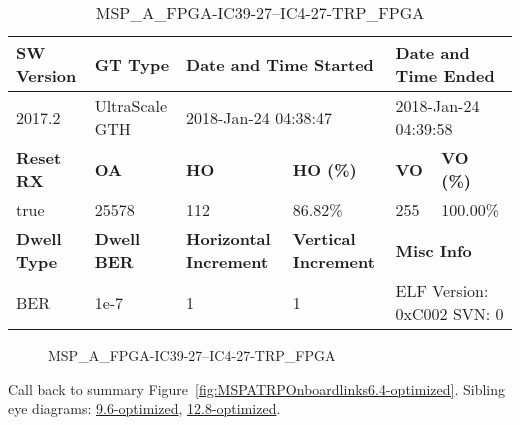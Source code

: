 \begin{table}[h]
\centering
\caption{MSP\_A\_FPGA-IC39-27--IC4-27-TRP\_FPGA}
\label{tab:MSPAFPGAIC3927IC427TRPFPGA6.4-optimized}
\begin{tabular}{@{}|l|l|l|l|l|l|@{}}
\toprule
\textbf{SW Version}                & \textbf{GT Type}   & \multicolumn{2}{l|}{\textbf{Date and Time Started}}            & \multicolumn{2}{l|}{\textbf{Date and Time Ended}}        \\ \midrule
2017.2                       & UltraScale GTH          & \multicolumn{2}{l|}{2018-Jan-24 04:38:47}                   & \multicolumn{2}{l|}{2018-Jan-24 04:39:58}               \\ \midrule
\textbf{Reset RX}                  & \textbf{OA} & \textbf{HO}   & \textbf{HO (\%)} & \textbf{VO} & \textbf{VO (\%)} \\ \midrule
true & 25578        & 112          & 86.82\%        & 255        & 100.00\%       \\ \midrule
\textbf{Dwell Type}                & \textbf{Dwell BER} & \textbf{Horizontal Increment} & \textbf{Vertical Increment}    & \multicolumn{2}{l|}{\textbf{Misc Info}}                  \\ \midrule
BER                            & 1e-7        & 1        & 1           & \multicolumn{2}{l|}{ELF Version: 0xC002 SVN: 0}                         \\ \bottomrule
\end{tabular}
\end{table}

\begin{figure}[h]
\caption{MSP\_A\_FPGA-IC39-27--IC4-27-TRP\_FPGA} \label{fig:MSPAFPGAIC3927IC427TRPFPGA6.4-optimized}
\end{figure}

Call back to summary Figure~\ref{fig:MSPATRPOnboardlinks6.4-optimized}.
Sibling eye diagrams: \hyperref[sec:MSPAFPGAIC3927IC427TRPFPGA9.6-optimized]{9.6-optimized}, \hyperref[sec:MSPAFPGAIC3927IC427TRPFPGA12.8-optimized]{12.8-optimized}.

\clearpage
\newpage


